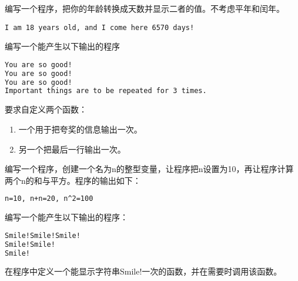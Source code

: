 \begin{frame}[fragile]\ft{\secname}
\begin{wenti}
编写一个程序，把你的年龄转换成天数并显示二者的值。不考虑平年和闰年。
\end{wenti}

\begin{lstlisting}
I am 18 years old, and I come here 6570 days!   
\end{lstlisting}

\end{frame}

\begin{frame}[fragile]\ft{\secname}
\begin{wenti}
编写一个能产生以下输出的程序
\begin{lstlisting}[language=tex]
You are so good!
You are so good!
You are so good!
Important things are to be repeated for 3 times.
\end{lstlisting}
要求自定义两个函数：
\begin{enumerate}
\item 一个用于把夸奖的信息输出一次。
\item 另一个把最后一行输出一次。
\end{enumerate}
\end{wenti}

\end{frame}

\begin{frame}[fragile]\ft{\secname}
\begin{wenti}
编写一个程序，创建一个名为n的整型变量，让程序把n设置为10，再让程序计算两个n的和与平方。程序的输出如下：
\end{wenti}
\begin{lstlisting}[language=tex]
n=10, n+n=20, n^2=100 
\end{lstlisting}
\end{frame}


\begin{frame}[fragile]\ft{\secname}
\begin{wenti}
编写一个能产生以下输出的程序：
\end{wenti}
\begin{lstlisting}[language=tex]
Smile!Smile!Smile!
Smile!Smile!
Smile!
\end{lstlisting}
在程序中定义一个能显示字符串Smile!一次的函数，并在需要时调用该函数。
\end{frame}

